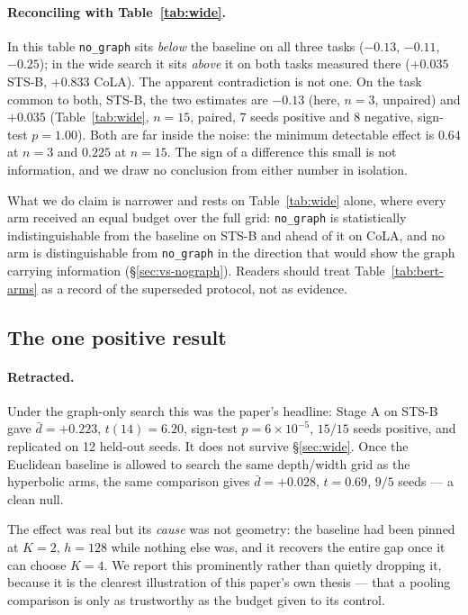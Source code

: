 \documentclass{article} %
\begin{document}
\paragraph{Reconciling with Table~\ref{tab:wide}.} In this table
\texttt{no\_graph} sits \emph{below} the baseline on all three tasks
($-0.13$, $-0.11$, $-0.25$); in the wide search it sits \emph{above} it on both
tasks measured there ($+0.035$ STS-B, $+0.833$ CoLA). The apparent
contradiction is not one. On the task common to both, STS-B, the two estimates
are $-0.13$ (here, $n=3$, unpaired) and $+0.035$ (Table~\ref{tab:wide},
$n=15$, paired, $7$ seeds positive and $8$ negative, sign-test $p = 1.00$).
Both are far inside the noise: the minimum detectable effect is $0.64$ at
$n=3$ and $0.225$ at $n=15$. The sign of a difference this small is not
information, and we draw no conclusion from either number in isolation.

What we do claim is narrower and rests on Table~\ref{tab:wide} alone, where
every arm received an equal budget over the full grid: \texttt{no\_graph} is
statistically indistinguishable from the baseline on STS-B and ahead of it on
CoLA, and no arm is distinguishable from \texttt{no\_graph} in the direction
that would show the graph carrying information (\S\ref{sec:vs-nograph}).
Readers should treat Table~\ref{tab:bert-arms} as a record of the superseded
protocol, not as evidence.

\subsection{The one positive result}
\label{sec:stsb-retracted}
\paragraph{Retracted.} Under the graph-only search this was the paper's
headline: Stage A on STS-B gave $\bar{d} = +0.223$, $t(14) = 6.20$, sign-test
$p = 6\times10^{-5}$, $15/15$ seeds positive, and replicated on 12 held-out
seeds. It does not survive \S\ref{sec:wide}. Once the Euclidean baseline is
allowed to search the same depth/width grid as the hyperbolic arms, the same
comparison gives $\bar{d} = +0.028$, $t = 0.69$, $9/5$ seeds --- a clean null.

The effect was real but its \emph{cause} was not geometry: the baseline had been
pinned at $K=2$, $h=128$ while nothing else was, and it recovers the entire gap
once it can choose $K=4$. We report this prominently rather than quietly
dropping it, because it is the clearest illustration of this paper's own thesis
--- that a pooling comparison is only as trustworthy as the budget given to its
control.
\end{document}
